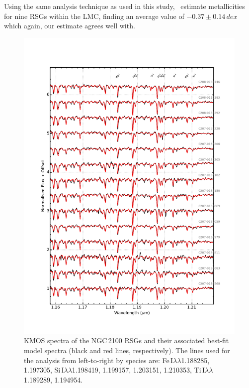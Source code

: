 \documentclass[useAMS,usenatbib]{mn2e}
\begin{document}
Using the same analysis technique as used in this study,~\cite{2015ApJ...806...21D} estimate metallicities for nine RSGs within the LMC, finding an average value of $-0.37\pm0.14\,dex$ which again,
our estimate agrees well with.


\begin{figure}
 \begin{center}
\includegraphics[width=16cm]{NGC2100-model-fits}
\caption{KMOS spectra of the NGC\,2100 RSGs and their associated best-fit model spectra
(black and red lines, respectively).
The lines used for the analysis from left-to-right by species are:
Fe\,I$\lambda\lambda$1.188285,
1.197305,
Si\,I$\lambda\lambda$1.198419,
1.199157,
1.203151,
1.210353,
Ti\,I$\lambda\lambda$1.189289,
1.194954.
         }
\label{fig:model_fits}
\end{center}
\end{figure}
\end{document}
